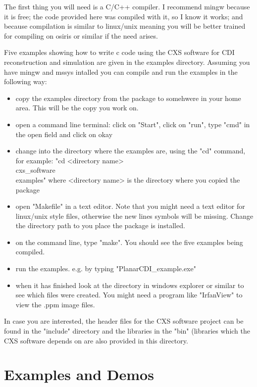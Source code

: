 \documentclass[]{cxs-software}
\begin{document}
The first thing you will need is a C/C++ compiler. I recommend mingw
because it is free; the code provided here was compiled with it, so I
know it works; and because compilation is similar to linux/unix
meaning you will be better trained for compiling on osiris or similar
if the need arises.

Five examples showing how to write c code using the CXS software for
CDI reconstruction and simulation are given in the examples directory.
Assuming you have mingw and mssys intalled you can compile and run the
examples in the following way:

\begin{itemize}
\item copy the examples directory from the package to somehwere in
  your home area. This will be the copy you work on.
\item open a command line terminal: click on "Start", click on "run",
  type "cmd" in the open field and click on okay
\item change into the directory where the examples are, using the "cd"
  command, for example: "cd <directory name>\\cxs\_software\\examples"
  where <directory name> is the directory where you copied the package
\item open "Makefile" in a text editor. Note that you might need a
  text editor for linux/unix style files, otherwise the new lines
  symbols will be missing. Change the directory path to you place the
  package is installed.
\item on the command line, type "make". You should see the five
  examples being compiled.
\item run the examples. e.g. by typing "PlanarCDI\_example.exe"
\item when it has finished look at the directory in windows explorer
  or similar to see which files were created. You might need a program
  like "IrfanView" to view the .ppm image files.
\end{itemize}

In case you are interested, the header files for the CXS software
project can be found in the "include" directory and the libraries in
the "bin" (libraries which the CXS software depends on are also
provided in this directory.


\newpage

\section{Examples and Demos}
\end{document}
